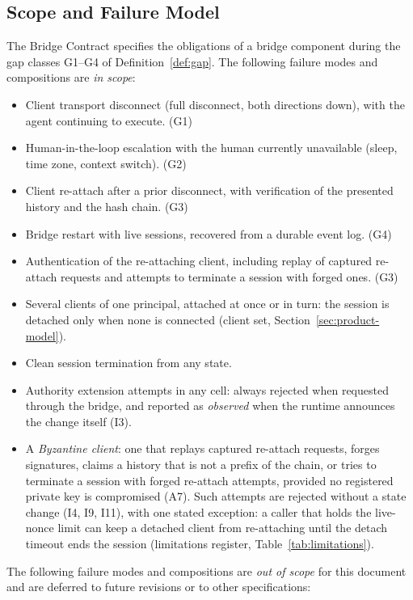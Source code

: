 \subsection{Scope and Failure Model}\label{sec:scope}

The Bridge Contract specifies the obligations of a bridge component
during the gap classes G1--G4 of Definition~\ref{def:gap}. The
following failure modes and compositions are \emph{in scope}:

\begin{itemize}[leftmargin=2em]
\item Client transport disconnect (full disconnect, both directions
down), with the agent continuing to execute. (G1)
\item Human-in-the-loop escalation with the human currently unavailable
(sleep, time zone, context switch). (G2)
\item Client re-attach after a prior disconnect, with verification of
the presented history and the hash chain. (G3)
\item Bridge restart with live sessions, recovered from a durable event
log. (G4)
\item Authentication of the re-attaching client, including replay of captured re-attach requests and attempts to
terminate a session with forged ones. (G3)
\item Several clients of one principal, attached at once or in turn:
the session is detached only when none is connected (client set,
Section~\ref{sec:product-model}).
\item Clean session termination from any state.
\item Authority extension attempts in any cell: always rejected when
requested through the bridge, and reported as \emph{observed} when the
runtime announces the change itself (I3).
\item A \emph{Byzantine client}: one that replays captured
re-attach requests, forges signatures, claims a history that is not a
prefix of the chain, or tries to terminate a session with forged
re-attach attempts, provided no registered private key is compromised
(A7). Such attempts are rejected without a state change (I4, I9, I11),
with one stated exception: a caller that holds the live-nonce limit can keep a detached client from
re-attaching until the detach timeout ends the session (limitations
register, Table~\ref{tab:limitations}).
\end{itemize}

The following failure modes and compositions are \emph{out of scope}
for this document and are deferred to future revisions or to other
specifications:

